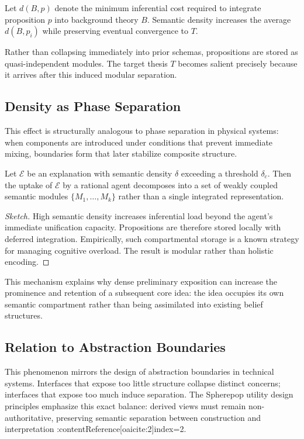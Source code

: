\begin{definition}
Let $d(B, p)$ denote the minimum inferential cost required to integrate proposition $p$ into background theory $B$. Semantic density increases the average $d(B, p_i)$ while preserving eventual convergence to $T$.
\end{definition}

Rather than collapsing immediately into prior schemas, propositions are stored as quasi-independent modules. The target thesis $T$ becomes salient precisely because it arrives after this induced modular separation.

\subsection{Density as Phase Separation}

This effect is structurally analogous to phase separation in physical systems: when components are introduced under conditions that prevent immediate mixing, boundaries form that later stabilize composite structure.

\begin{lemma}
Let $\mathcal{E}$ be an explanation with semantic density $\delta$ exceeding a threshold $\delta_c$. Then the uptake of $\mathcal{E}$ by a rational agent decomposes into a set of weakly coupled semantic modules $\{M_1, \dots, M_k\}$ rather than a single integrated representation.
\end{lemma}

\begin{proof}[Sketch]
High semantic density increases inferential load beyond the agent’s immediate unification capacity. Propositions are therefore stored locally with deferred integration. Empirically, such compartmental storage is a known strategy for managing cognitive overload. The result is modular rather than holistic encoding.
\end{proof}

This mechanism explains why dense preliminary exposition can increase the prominence and retention of a subsequent core idea: the idea occupies its own semantic compartment rather than being assimilated into existing belief structures.

\subsection{Relation to Abstraction Boundaries}

This phenomenon mirrors the design of abstraction boundaries in technical systems. Interfaces that expose too little structure collapse distinct concerns; interfaces that expose too much induce separation. The Spherepop utility design principles emphasize this exact balance: derived views must remain non-authoritative, preserving semantic separation between construction and interpretation :contentReference[oaicite:2]{index=2}.

